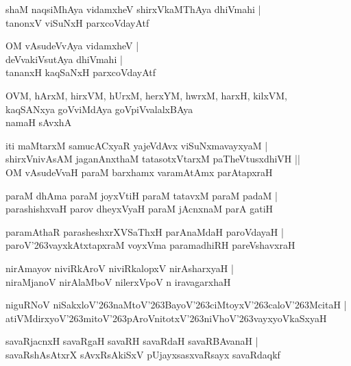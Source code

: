 \documentclass[twoside,12pt,openright]{book}
\def\S{\char'263}
\newcounter{shloka}[chapter]
\begin{document}
\begin{shloka}%
shaM naqsiMhAya vidamxheV shirxVkaMThAya dhiVmahi |\\
tanonxV viSuNxH parxcoVdayAtf 
\end{shloka}

\begin{shloka}%
OM vAsudeVvAya vidamxheV |\\
deVvakiVsutAya dhiVmahi |\\
tananxH kaqSaNxH parxcoVdayAtf
\end{shloka}

\begin{shloka}%
OVM, hArxM, hirxVM, hUrxM, herxYM, hwrxM, harxH, kilxVM, \\
kaqSANxya goVviMdAya goVpiVvalalxBAya\\
namaH sAvxhA
\end{shloka}

\begin{shloka}%
iti maMtarxM samucACxyaR yajeVdAvx viSuNxmavayxyaM |\\
shirxVnivAsAM jaganAnxthaM tatasotxVtarxM paTheVtusxdhiVH ||\\
OM vAsudeVvaH paraM barxhamx varamAtAmx parAtapxraH 
\end{shloka}

\begin{shloka}%
paraM dhAma paraM joyxVtiH paraM tatavxM paraM padaM |\\
parashishxvaH parov dheyxVyaH paraM jAcnxnaM parA gatiH 
\end{shloka}

\begin{shloka}%
paramAthaR parasheshxrXVSaThxH parAnaMdaH paroVdayaH |\\
paroV\S vayxkAtxtapxraM voyxVma paramadhiRH pareVshavxraH
\end{shloka}

\begin{shloka}%
nirAmayov niviRkAroV niviRkalopxV nirAsharxyaH |\\
niraMjanoV nirAlaMboV nilerxVpoV n iravagarxhaH
\end{shloka}

\begin{shloka}%
niguRNoV niSakxloV\S naMtoV\S BayoV\S ciMtoyxV\S caloV\S McitaH |\\
atiVMdirxyoV\S mitoV\S pAroVnitotxV\S niVhoV\S vayxyoVkaSxyaH
\end{shloka}

\begin{shloka}%
savaRjacnxH savaRgaH savaRH savaRdaH savaRBAvanaH |\\
savaRshAsAtxrX sAvxRsAkiSxV pUjayxsasxvaRsayx savaRdaqkf
\end{shloka}
\end{document}
